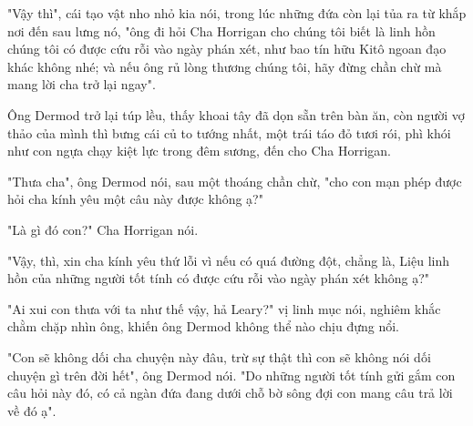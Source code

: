 "Vậy thì", cái tạo vật nho nhỏ kia nói, trong lúc những đứa còn lại tủa ra từ khắp nơi đến sau lưng nó, "ông đi hỏi Cha Horrigan cho chúng tôi biết là linh hồn chúng tôi có được cứu rỗi vào ngày phán xét, như bao tín hữu Kitô ngoan đạo khác không nhé; và nếu ông rủ lòng thương chúng tôi, hãy đừng chần chừ mà mang lời cha trở lại ngay".

Ông Dermod trở lại túp lều, thấy khoai tây đã dọn sẵn trên bàn ăn, còn người vợ thảo của mình thì bưng cái củ to tướng nhất, một trái táo đỏ tươi rói, phì khói như con ngựa chạy kiệt lực trong đêm sương, đến cho Cha Horrigan.

"Thưa cha", ông Dermod nói, sau một thoáng chần chừ, "cho con mạn phép được hỏi cha kính yêu một câu này được không ạ?"

"Là gì đó con?" Cha Horrigan nói.

"Vậy, thì, xin cha kính yêu thứ lỗi vì nếu có quá đường đột, chẳng là, Liệu linh hồn của những người tốt tính có được cứu rỗi vào ngày phán xét không ạ?"

"Ai xui con thưa với ta như thế vậy, hả Leary?" vị linh mục nói, nghiêm khắc chằm chặp nhìn ông, khiến ông Dermod không thể nào chịu đựng nổi.

"Con sẽ không dối cha chuyện này đâu, trừ sự thật thì con sẽ không nói dối chuyện gì trên đời hết", ông Dermod nói. "Do những người tốt tính gửi gắm con câu hỏi này đó, có cả ngàn đứa đang dưới chỗ bờ sông đợi con mang câu trả lời về đó ạ".